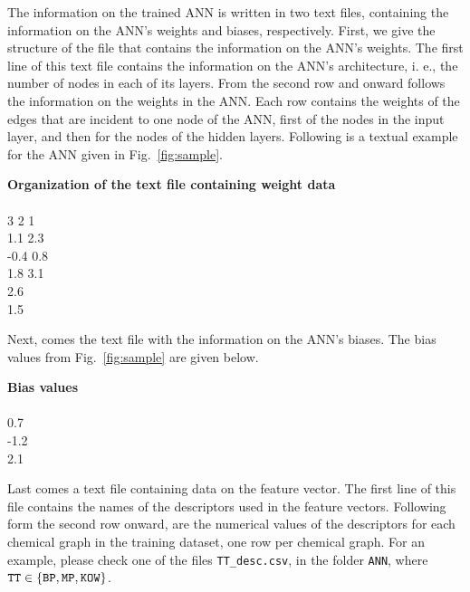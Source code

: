 \documentclass[11pt, titlepage, dvipdfmx, twoside]{article}
\begin{document}
The information on the trained ANN is written in two text files, containing the information
on the ANN's weights and biases, respectively.
First, we give the structure of the file that contains the information on the ANN's weights.
The first line of this text file contains the information on the ANN's architecture, i. e., 
the number of nodes in each of its layers.
From the second row and onward
follows the information on the 
weights in the ANN.
Each row contains the weights of the edges that are incident to one node of the ANN,
first of the nodes in the input layer, and then for the nodes of the hidden layers.
Following is a textual example for the ANN given in Fig.~\ref{fig:sample}.

\bigskip

\begin{oframed}
{\bf Organization of the text file containing weight data}\\\\
3 2 1\\
1.1 2.3\\
-0.4 0.8\\
1.8 3.1\\
2.6\\
1.5\\
\end{oframed}

\bigskip


Next, comes the text file with the information on the ANN's biases.
The bias values from Fig.~\ref{fig:sample} are given below.

\bigskip

\begin{oframed}
{\bf Bias values}\\\\
0.7\\
-1.2\\
2.1\\
\end{oframed}

\bigskip

Last comes a text file containing data on the feature vector.
The first line of this file contains the names of the descriptors used in the feature vectors.
Following form the second row onward, are the numerical values of the descriptors for each chemical graph
in the training dataset, one row per chemical graph.
For an example, please check one of the files  {\tt TT\_desc.csv},  in the folder {\tt ANN},
where ${\tt TT} \in \{{\tt BP, MP, KOW}\}$.
\end{document}

